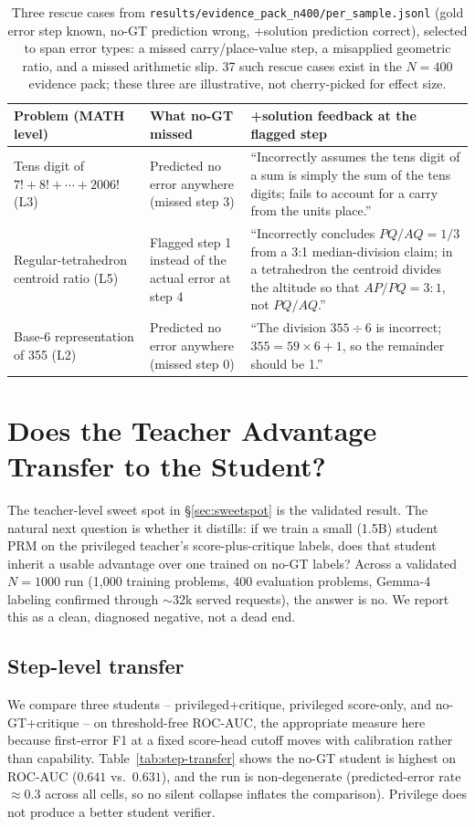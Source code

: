 \documentclass[11pt]{article}
\begin{document}
\begin{table}[t]
\centering
\small
\begin{tabular}{p{2.4cm}p{4.6cm}p{5.4cm}}
\toprule
Problem (MATH level) & What no-GT missed & +solution feedback at the flagged step \\
\midrule
Tens digit of $7!+8!+\cdots+2006!$ (L3) & Predicted no error anywhere (missed step 3) & ``Incorrectly assumes the tens digit of a sum is simply the sum of the tens digits; fails to account for a carry from the units place.'' \\
Regular-tetrahedron centroid ratio (L5) & Flagged step 1 instead of the actual error at step 4 & ``Incorrectly concludes $PQ/AQ=1/3$ from a 3{:}1 median-division claim; in a tetrahedron the centroid divides the altitude so that $AP/PQ=3{:}1$, not $PQ/AQ$.'' \\
Base-6 representation of 355 (L2) & Predicted no error anywhere (missed step 0) & ``The division $355 \div 6$ is incorrect; $355 = 59 \times 6 + 1$, so the remainder should be 1.'' \\
\bottomrule
\end{tabular}
\caption{Three rescue cases from \texttt{results/evidence\_pack\_n400/per\_sample.jsonl}
(gold error step known, no-GT prediction wrong, +solution prediction correct),
selected to span error types: a missed carry/place-value step, a misapplied
geometric ratio, and a missed arithmetic slip. 37 such rescue cases exist in
the $N{=}400$ evidence pack; these three are illustrative, not
cherry-picked for effect size.}
\label{tab:flip-cases}
\end{table}

\section{Does the Teacher Advantage Transfer to the Student?}
\label{sec:transfer}

The teacher-level sweet spot in \S\ref{sec:sweetspot} is the validated
result. The natural next question is whether it distills: if we train a
small (1.5B) student PRM on the privileged teacher's score-plus-critique
labels, does that student inherit a usable advantage over one trained on
no-GT labels? Across a validated $N=1000$ run (1{,}000 training problems,
400 evaluation problems, Gemma-4 labeling confirmed through $\sim$32k served
requests), the answer is no. We report this as a clean, diagnosed negative,
not a dead end.

\subsection{Step-level transfer}
We compare three students -- privileged+critique, privileged score-only, and
no-GT+critique -- on threshold-free ROC-AUC, the appropriate measure here
because first-error F1 at a fixed score-head cutoff moves with calibration
rather than capability. Table~\ref{tab:step-transfer} shows the no-GT
student is highest on ROC-AUC ($0.641$ vs.\ $0.631$), and the run is
non-degenerate (predicted-error rate $\approx 0.3$ across all cells, so no
silent collapse inflates the comparison). Privilege does not produce a
better student verifier.
\end{document}
